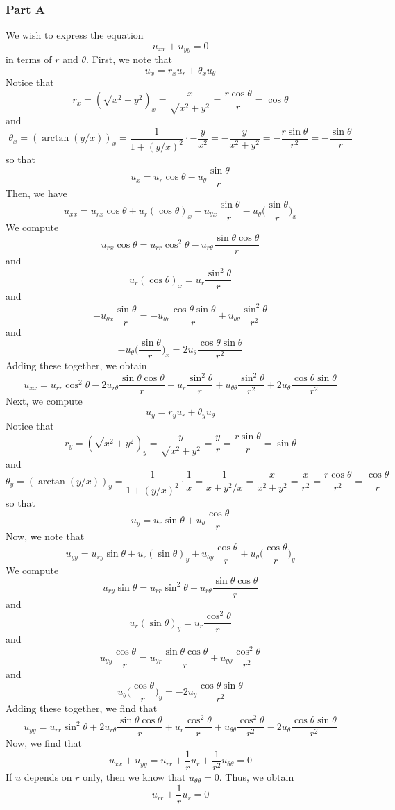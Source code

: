 \documentclass[12pt]{article}
\begin{document}
\subsubsection*{Part A}
We wish to express the equation 
\[
u_{xx} + u_{yy} = 0
\] in terms of $r$ and $\theta$. First, we note that
\[
u_x = r_x u_r + \theta_x u_\theta
\] Notice that
\[
r_x = (\sqrt{x^2+y^2})_x = \frac{x}{\sqrt{x^2+y^2}} = \frac{r \cos \theta}{r} = \cos \theta 
\] and 
\[
\theta_x = (\arctan(y/x))_x = \frac{1}{1+(y/x)^2}\cdot -\frac{y}{x^2} = -\frac{y}{x^2+y^2} = -\frac{r\sin \theta}{r^2} = -\frac{\sin \theta}{r}
\] so that 
\[
u_x =  u_r \cos \theta   - u_\theta \frac{\sin \theta}{r} 
\] Then, we have
\[
u_{xx} = u_{rx} \cos \theta + u_r (\cos\theta)_x - u_{\theta x} \frac{\sin \theta}{r} - u_\theta \bigg(\frac{\sin \theta}{r}\bigg)_x
\] We compute
\[
u_{rx} \cos \theta = u_{rr} \cos^2 \theta - u_{r\theta}\frac{\sin\theta\cos\theta}{r}
\] and
\[
u_r (\cos\theta)_x = u_r \frac{\sin^2\theta}{r}
\] and
\[
-u_{\theta x} \frac{\sin \theta}{r} = -u_{\theta r} \frac{\cos \theta \sin \theta}{r} + u_{\theta\theta}\frac{\sin^2\theta}{r^2}
\] and 
\[
- u_\theta \bigg(\frac{\sin \theta}{r}\bigg)_x = 2u_\theta \frac{\cos \theta \sin \theta}{r^2}
\] Adding these together, we obtain
\[
u_{xx} = u_{rr} \cos^2\theta - 2u_{r\theta} \frac{\sin \theta \cos \theta}{r} + u_r \frac{\sin^2\theta}{r} + u_{\theta \theta} \frac{\sin^2\theta}{r^2} + 2u_\theta \frac{\cos \theta \sin \theta}{r^2}
\] Next, we compute
\[
u_{y} = r_y u_r + \theta_y u_\theta 
\] Notice that
\[
r_y = (\sqrt{x^2+y^2})_y = \frac{y}{\sqrt{x^2+y^2}} = \frac{y}{r} = \frac{r \sin \theta}{r} = \sin \theta
\] and
\[
\theta_y = (\arctan(y/x))_y = \frac{1}{1+(y/x)^2} \cdot \frac{1}{x} = \frac{1}{x+y^2/x} = \frac{x}{x^2+y^2} = \frac{x}{r^2} = \frac{r \cos \theta}{r^2} = \frac{\cos \theta}{r}
\] so that
\[
u_{y} = u_r\sin \theta + u_\theta  \frac{\cos \theta}{r}
\] Now, we note that
\[
u_{yy} = u_{ry} \sin \theta + u_r (\sin \theta)_y + u_{\theta y} \frac{\cos \theta}{r} + u_\theta \bigg( \frac{\cos \theta}{r}\bigg)_y
\] We compute
\[
u_{ry} \sin \theta = u_{rr} \sin^2 \theta + u_{r\theta} \frac{\sin \theta \cos \theta}{r}
\] and
\[
u_r (\sin \theta)_y = u_r \frac{\cos^2\theta}{r}
\] and 
\[
u_{\theta y} \frac{\cos \theta}{r} = u_{\theta r} \frac{\sin \theta \cos \theta}{r} + u_{\theta \theta} \frac{\cos^2\theta}{r^2}
\] and 
\[
u_\theta \bigg(\frac{\cos \theta}{r}\bigg)_y = -2u_\theta \frac{\cos\theta\sin\theta}{r^2}
\] Adding these together, we find that
\[
u_{yy} = u_{rr} \sin^2 \theta + 2u_{r\theta} \frac{\sin \theta \cos \theta}{r} + u_r \frac{\cos^2\theta}{r} + u_{\theta \theta} \frac{\cos^2\theta}{r^2} -2u_\theta \frac{\cos\theta\sin\theta}{r^2}
\] Now, we find that
\[
u_{xx} + u_{yy} = u_{rr} + \frac{1}{r}u_r + \frac{1}{r^2}u_{\theta\theta} = 0
\] If $u$ depends on $r$ only, then we know that $u_{\theta\theta} = 0$. Thus, we obtain
\[
u_{rr} + \frac{1}{r}u_r = 0
\] 
\end{document}
